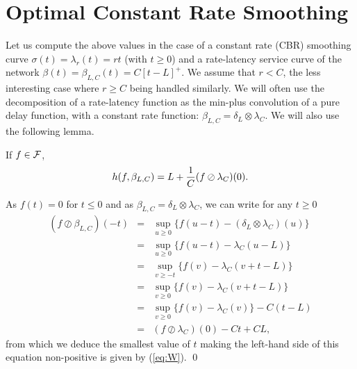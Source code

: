 \section{Optimal Constant Rate Smoothing}


Let us compute the above values in the case of a constant rate (CBR) smoothing curve $\sigma(t) = \lambda_r(t) = rt$
(with $t \geq 0$) and a rate-latency service curve of the network $\beta(t) = \beta_{L,C}(t) = C[t-L]^{+} $. We assume that $r < C$,
the less interesting case where $r \geq C$ being handled similarly.
We will often use the decomposition of a rate-latency function as the min-plus convolution of a pure delay function, with a constant rate function:
$\beta_{L,C} = \delta_L \otimes \lambda_C$.
We will also use the following lemma.


\begin{lemma}
If $f \in {\cal F}$,
\begin{equation}
\mylabel{eq:W}
h(f, \beta_{L,C}) = L + \frac{1}{C} (f \oslash \lambda_C)(0).
\end{equation}


\end{lemma}

\pr As $f(t) = 0 $ for $ t \leq 0$ and as $\beta_{L,C} = \delta_L \otimes \lambda_C$, we can write for any $t \geq 0$
\begin{eqnarray*}
(f \oslash \beta_{L,C}) (-t)
    & = & \sup_{u \geq 0} \{ f(u-t) - (\delta_L \otimes \lambda_C)(u) \} \\
    & = & \sup_{u \geq 0} \{ f(u-t) - \lambda_C(u-L) \} \\
    & = & \sup_{v \geq - t} \{ f(v) - \lambda_C(v + t -L) \} \\
    & = & \sup_{v \geq 0} \{ f(v) - \lambda_C(v + t - L) \} \\
    & = & \sup_{v \geq 0} \{ f(v) - \lambda_C(v) \} - C(t - L) \\
    & = & (f \oslash \lambda_C)(0) - C t + C L ,
\end{eqnarray*}
from which we deduce the smallest value of $t$ making the left-hand side of this equation
non-positive is given by (\ref{eq:W}).
\qed


